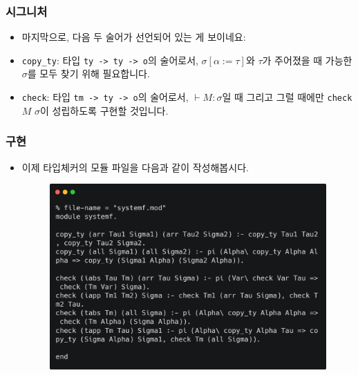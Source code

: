 \documentclass[slidestop,compress,mathserif]{beamer}
\begin{document}
    \begin{frame}
        \frametitle{시그니처}
        \begin{itemize}
            \item 마지막으로, 다음 두 술어가 선언되어 있는 게 보이네요:
            \item \texttt{copy\_ty}: 타입 \texttt{ty -> ty -> o}의 술어로서, $\sigma \left[ \alpha := \tau \right]$와 $\tau$가 주어졌을 때 가능한 $\sigma$를 모두 찾기 위해 필요합니다.
            \item \texttt{check}: 타입 \texttt{tm -> ty -> o}의 술어로서, $\vdash M : \sigma$일 때 그리고 그럴 때에만 \texttt{check} $M$ $\sigma$이 성립하도록 구현할 것입니다.
        \end{itemize}
    \end{frame}

    \begin{frame}
        \frametitle{구현}
        \begin{itemize}
            \item 이제 타입체커의 모듈 파일을 다음과 같이 작성해봅시다.
            \begin{figure}[h]
                \begin{center}
                    \includegraphics[width=1.0\linewidth]{mod.png}
                \end{center}
            \end{figure}
        \end{itemize}
    \end{frame}
\end{document}
